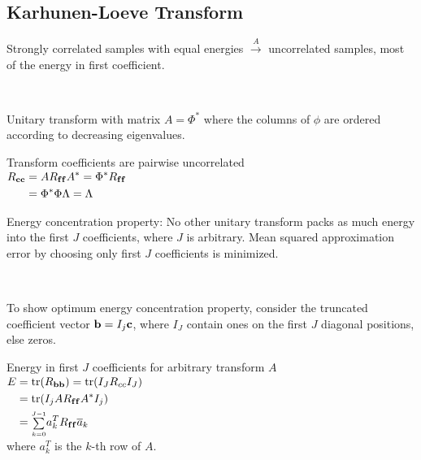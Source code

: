 \begin{compactdesc}
\section{Karhunen-Loeve Transform}
		Strongly correlated samples with equal energies $\xrightarrow{A}$ uncorrelated samples, most of the energy in first coefficient.
	\item[\lp{Properties}]\hfill\\
		\begin{enumerate*}[label=\protect\circled{\arabic*},itemjoin=]
			\item Unitary transform with matrix $A=\Phi^*$ where the columns of $\phi$ are ordered according to decreasing eigenvalues.
			\item Transform coefficients are pairwise uncorrelated\\
				$
				\begin{aligned}
					R_{\bm{\mathrm{c}}\bm{\mathrm{c}}}&=AR_{\bm{\mathrm{f}}\bm{\mathrm{f}}}A^*=\Phi^*R_{\bm{\mathrm{f}}\bm{\mathrm{f}}}\\
					&=\Phi^*\Phi\Lambda=\Lambda
				\end{aligned}
				$\\
			\item Energy concentration property: No other unitary transform packs as much energy into the first $J$ coefficients, where $J$ is arbitrary. Mean squared approximation error by choosing only first $J$ coefficients is minimized.
		\end{enumerate*}
	\item[\lp{Optimal energy concentration}]\hfill\\
		\begin{enumerate*}[label=\protect\circled{\arabic*},itemjoin=]
		\item To show optimum energy concentration property, consider the truncated coefficient vector $\bm{\mathrm{b}}=I_j\bm{\mathrm{c}}$, where $I_J$ contain ones on the first $J$ diagonal positions, else zeros.\\
		\item Energy in first $J$ coefficients for arbitrary transform $A$\\
			$
			\begin{aligned}
				E&=\operatorname{tr}(R_{\bm{\mathrm{b}}\bm{\mathrm{b}}})=\operatorname{tr}(I_JR_{cc}I_J)\\
				&=\operatorname{tr}(I_jAR_{\bm{\mathrm{f}}\bm{\mathrm{f}}}A^*I_j)\\
				&={\scriptstyle\sum\limits_{k=0}^{J-1}}a_{k}^TR_{\bm{\mathrm{f}}\bm{\mathrm{f}}}\overline{a}_k
			\end{aligned}
			$\\
			where $a_k^T$ is the $k$-th row of $A$.\\

\end{enumerate*}
\end{compactdesc}
